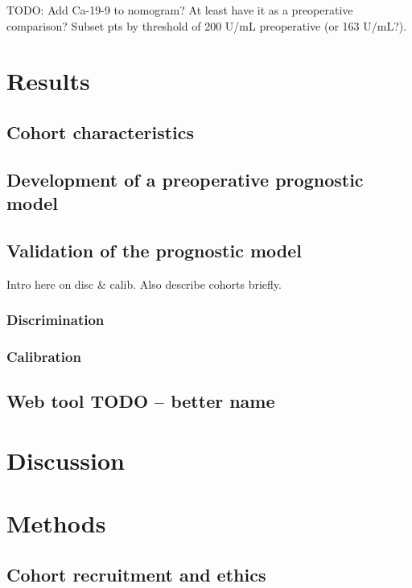 \documentclass[dissertation.tex]{subfiles}
\begin{document}
TODO: Add Ca-19-9 to nomogram?  At least have it as a preoperative comparison?  Subset pts by threshold of 200 U/mL preoperative (or 163 U/mL?).

\section{Results}
\subsection{Cohort characteristics}
\label{subsec:nomo-results-cohort}

\subsection{Development of a preoperative prognostic model}

\subsection{Validation of the prognostic model}
Intro here on disc \& calib.  Also describe cohorts briefly.
\subsubsection{Discrimination}
\subsubsection{Calibration}

\subsection{Web tool TODO -- better name}

\section{Discussion}

\section{Methods}
\subsection{Cohort recruitment and ethics}
\label{subsec:nomo-methods-cohort}
\end{document}
